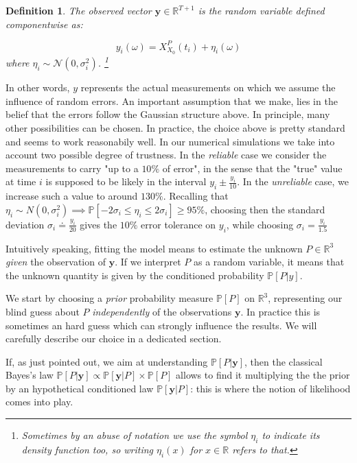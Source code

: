 \documentclass[8pt]{article}
\newtheorem{definition}{Definition}
\begin{document}
\begin{definition}
	The \emph{observed vector} $\textbf{y} \in \mathbb{R}^{T+1}$
	is the random variable defined componentwise as:

\begin{equation}
	y_i(\omega) = X^P_{X_0} (t_i) + \eta_i(\omega)
\end{equation}
where $\eta_i \sim \mathcal{N}(0, \sigma^2_i)$.
\footnote{Sometimes by an abuse of notation 
we use the symbol $\eta_i$ to indicate its density function too,
so writing $\eta_i(x)$ for $x \in \mathbb{R}$ refers to that.}
\end{definition}


In other words, $y$ represents the actual measurements on which we
assume the influence of random errors. An important assumption that
we make, lies in the belief that the errors follow the
Gaussian structure above. In principle, many other possibilities
can be chosen.
In practice, the choice above is pretty standard and 
seems to work reasonabily well.
In our numerical simulations we take into account two
possible degree of trustness. In the \emph{reliable}
case we consider the measurements
to carry "up to a $10\%$ of error", in the sense that
the "true" value at time $i$ is supposed to be likely in the interval
$y_i \pm \frac{y_i}{10}$. In the \emph{unreliable}
case, we increase such a value to around $130\%$.
Recalling that
$\eta_i \sim N(0, \sigma_i^2) \implies 
\mathbb{P}[ - 2 \sigma_i \leq \eta_i \leq 2 \sigma_i] \geq 95\%$, choosing
then the standard deviation
$\sigma_i \doteq \frac{y_i}{20}$ gives the $10\%$ error
tolerance on $y_i$, while choosing $\sigma_i = \frac{y_i}{1.5}$



Intuitively speaking, fitting the model means to estimate
the unknown $P \in \mathbb{R}^3$ \emph{given} the observation of $\textbf{y}$.
If we interpret $P$ as a random variable, it means that 
the unknown quantity is given by the conditioned
probability $\mathbb{P}[P | y]$.


We start by choosing a \emph{prior} probability measure $\mathbb{P}[P]$ on 
$\mathbb{R}^3$, representing our blind guess about 
$P$ \emph{independently} of the 
observations $\textbf{y}$. In practice this is sometimes an hard guess
which can strongly influence the results.
We will carefully describe our choice in a dedicated section.


If, as just pointed out, we aim at understanding 
$\mathbb{P}[P | \textbf{y}]$, then the classical Bayes's law
$\mathbb{P}[P | \textbf{y}] \propto
	\mathbb{P}[\textbf{y} | P] \times \mathbb{P}[P]$
allows to find it multiplying the the prior  
by an hypothetical conditioned law $\mathbb{P}[\textbf{y} | P]$: this
is where the notion of likelihood comes into play.
\end{document}
